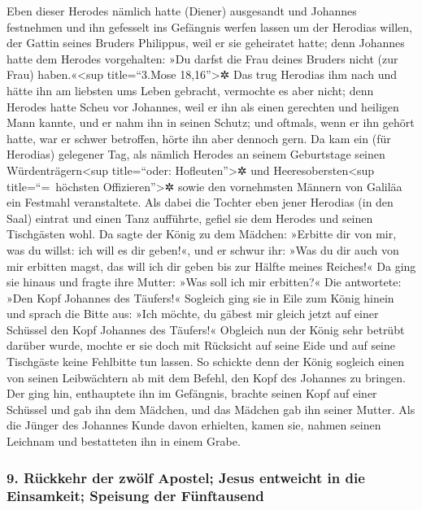  Eben dieser Herodes nämlich hatte (Diener) ausgesandt
und Johannes festnehmen und ihn gefesselt ins Gefängnis werfen lassen um
der Herodias willen, der Gattin seines Bruders Philippus, weil er sie
geheiratet hatte;  denn Johannes hatte dem Herodes
vorgehalten: »Du darfst die Frau deines Bruders nicht (zur Frau)
haben.«\textless sup title=``3.Mose 18,16''\textgreater✲ 
Das trug Herodias ihm nach und hätte ihn am liebsten ums Leben gebracht,
vermochte es aber nicht;  denn Herodes hatte Scheu vor
Johannes, weil er ihn als einen gerechten und heiligen Mann kannte, und
er nahm ihn in seinen Schutz; und oftmals, wenn er ihn gehört hatte, war
er schwer betroffen, hörte ihn aber dennoch gern.  Da kam
ein (für Herodias) gelegener Tag, als nämlich Herodes an seinem
Geburtstage seinen Würdenträgern\textless sup title=``oder:
Hofleuten''\textgreater✲ und Heeresobersten\textless sup
title=``=~höchsten Offizieren''\textgreater✲ sowie den vornehmsten
Männern von Galiläa ein Festmahl veranstaltete.  Als
dabei die Tochter eben jener Herodias (in den Saal) eintrat und einen
Tanz aufführte, gefiel sie dem Herodes und seinen Tischgästen wohl. Da
sagte der König zu dem Mädchen: »Erbitte dir von mir, was du willst: ich
will es dir geben!«,  und er schwur ihr: »Was du dir auch
von mir erbitten magst, das will ich dir geben bis zur Hälfte meines
Reiches!«  Da ging sie hinaus und fragte ihre Mutter:
»Was soll ich mir erbitten?« Die antwortete: »Den Kopf Johannes des
Täufers!«  Sogleich ging sie in Eile zum König hinein und
sprach die Bitte aus: »Ich möchte, du gäbest mir gleich jetzt auf einer
Schüssel den Kopf Johannes des Täufers!«  Obgleich nun
der König sehr betrübt darüber wurde, mochte er sie doch mit Rücksicht
auf seine Eide und auf seine Tischgäste keine Fehlbitte tun lassen.
 So schickte denn der König sogleich einen von seinen
Leibwächtern ab mit dem Befehl, den Kopf des Johannes zu bringen. Der
ging hin, enthauptete ihn im Gefängnis,  brachte seinen
Kopf auf einer Schüssel und gab ihn dem Mädchen, und das Mädchen gab ihn
seiner Mutter.  Als die Jünger des Johannes Kunde davon
erhielten, kamen sie, nahmen seinen Leichnam und bestatteten ihn in
einem Grabe.

\hypertarget{ruxfcckkehr-der-zwuxf6lf-apostel-jesus-entweicht-in-die-einsamkeit-speisung-der-fuxfcnftausend}{%
\subsubsection{9. Rückkehr der zwölf Apostel; Jesus entweicht in die
Einsamkeit; Speisung der
Fünftausend}\label{ruxfcckkehr-der-zwuxf6lf-apostel-jesus-entweicht-in-die-einsamkeit-speisung-der-fuxfcnftausend}}

